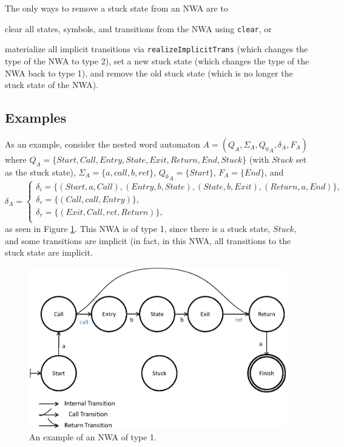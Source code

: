 \documentclass{llncs}
\begin{document}
The only ways to remove a stuck state from an NWA are to \begin{inparaenum} \item clear all states, symbols, and transitions from the NWA using \texttt{clear}, or \item materialize all implicit transitions via \texttt{realizeImplicitTrans} (which changes the type of the NWA to type 2), set a new stuck state (which changes the type of the NWA back to type 1), and remove the old stuck state (which is no longer the stuck state of the NWA).\end{inparaenum}


\subsection{Examples}
\label{Se:Examples}

As an example, consider the nested word automaton $A = (Q_A, \Sigma_A, {Q_0}_A, \delta_A, F_A)$ where $Q_A = \{Start, Call, Entry, State, Exit, Return, End, Stuck\}$ (with $Stuck$ set as the stuck state), $\Sigma_A = \{a, call, b, ret\}$, ${Q_0}_A = \{Start\}$, $F_A = \{End\}$, and \\
$\delta_A = 
\begin{cases} 
\delta_i = \{(Start,a,Call), (Entry,b,State), (State,b,Exit), (Return,a,End)\}, \\
\delta_c = \{(Call,call,Entry)\}, \\ 
\delta_r = \{(Exit,Call,ret,Return)\}, \\ 
\end{cases}$
as seen in Figure \ref{Fig:Example1}.  This NWA is of type 1, since there is a stuck state, $Stuck$, and some transitions are implicit (in fact, in this NWA, all transitions to the stuck state are implicit.  
 
\begin{figure}[htb]
  \centering
    \includegraphics[width=12cm]{Figures/Figure1.eps}
  \caption{An example of an NWA of type 1.}
  \label{Fig:Example1}
\end{figure}
\end{document}
